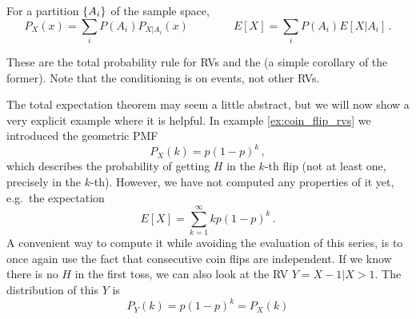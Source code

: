 \begin{prop}
For a partition $\qty{A_i}$ of the sample space,
\begin{equation}
P_X(x) = \sum_i P(A_i) P_{X | A_i}(x) \qquad \qquad E[X] = \sum_i P(A_i) E[X | A_i] \, .
\end{equation}
\end{prop}
These are the total probability rule for RVs and the  (a simple corollary of the former). Note that the conditioning is on events, not other RVs.


\begin{ex}[Memorylessness]
The total expectation theorem may seem a little abstract, but we will now show a very explicit example where it is helpful. In example \ref{ex:coin_flip_rvs} we introduced the geometric PMF
\begin{equation*}
P_X(k) = p (1 - p)^k \, ,
\end{equation*}
which describes the probability of getting $H$ in the $k$-th flip (not at least one, precisely in the $k$-th). However, we have not computed any properties of it yet, e.g.~the expectation
\begin{equation*}
E[X] = \sum_{k = 1}^\infty k p (1 - p)^k \, .
\end{equation*}
A convenient way to compute it while avoiding the evaluation of this series, is to once again use the fact that consecutive coin flips are independent. If we know there is no $H$ in the first toss, we can also look at the RV $Y = X - 1 | X > 1$. The distribution of this $Y$ is
\begin{equation*}
P_Y(k) = p (1 - p)^k = P_X(k)
\end{equation*} 

\end{ex}
